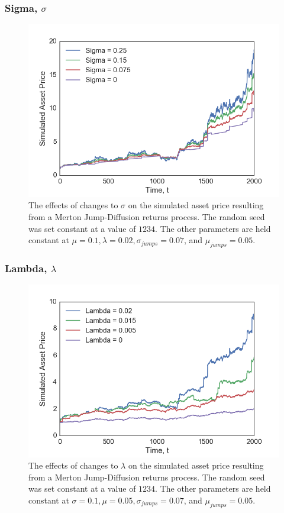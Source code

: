 \documentclass[11pt,oneside,openany,a4paper,english, report, goldenblock
]{usthesis}
\begin{document}
\subsubsection{Sigma, $\sigma$}

\begin{figure}[h]
	\centering
	\includegraphics[width=0.65\linewidth]{Images/Parameter-Effects/Effects_Sigma}
	\caption[The effects of changes to $\sigma$ on the Merton Jump-Diffusion returns process]{The effects of changes to $\sigma$ on the simulated asset price resulting from a Merton Jump-Diffusion returns process. The random seed was set constant at a value of $1234$. The other parameters are held constant at $\mu=0.1, \lambda=0.02, \sigma_{jumps}=0.07$, and $\mu_{jumps}=0.05$.}
	\label{fig:effects_sigma}
\end{figure}

\subsubsection{Lambda, $\lambda$}

\begin{figure}[h]
	\centering
	\includegraphics[width=0.7\linewidth]{Images/Parameter-Effects/Effects_Lambda}
	\caption[The effects of changes to $\lambda$ on the Merton Jump-Diffusion returns process]{The effects of changes to $\lambda$ on the simulated asset price resulting from a Merton Jump-Diffusion returns process. The random seed was set constant at a value of $1234$. The other parameters are held constant at $\sigma=0.1, \mu=0.05, \sigma_{jumps}=0.07$, and $\mu_{jumps}=0.05$.}
	\label{fig:effects_lambda}
\end{figure}
\end{document}
